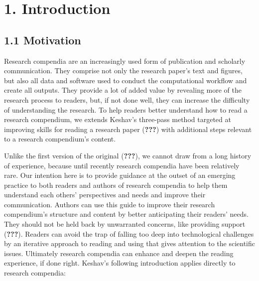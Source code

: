 \documentclass[twocolumn]{article}
\title{}
\author{}
\date{}
\begin{document}
\hypertarget{introduction}{%
\section*{1. Introduction}\label{introduction}}

\hypertarget{motivation}{%
\subsection*{1.1 Motivation}\label{motivation}}

Research compendia are an increasingly used form of publication and
scholarly communication. They comprise not only the research paper's
text and figures, but also all data and software used to conduct the
computational workflow and create all outputs. They provide a lot of
added value by revealing more of the research process to readers, but,
if not done well, they can increase the difficulty of understanding the
research. To help readers better understand how to read a research
compendium, we extends Keshav's three-pass method targeted at improving
skills for reading a research paper ({\textbf{???}}) with additional
steps relevant to a research compendium's content.

Unlike the first version of the original ({\textbf{???}}), we cannot
draw from a long history of experience, because until recently research
compendia have been relatively rare. Our intention here is to provide
guidance at the outset of an emerging practice to both readers and
authors of research compendia to help them understand each others'
perspectives and needs and improve their communication. Authors can use
this guide to improve their research compendium's structure and content
by better anticipating their readers' needs. They should not be held
back by unwarranted concerns, like providing support ({\textbf{???}}).
Readers can avoid the trap of falling too deep into technological
challenges by an iterative approach to reading and using that gives
attention to the scientific issues. Ultimately research compendia can
enhance and deepen the reading experience, if done right. Keshav's
following introduction applies directly to research compendia:
\end{document}

